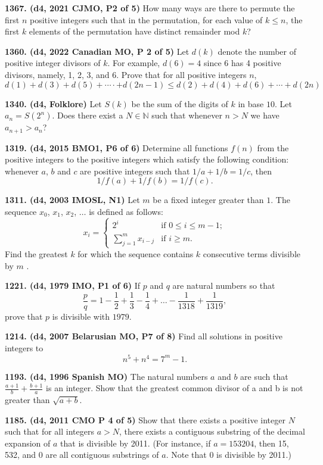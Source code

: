 \documentclass{article}
\begin{document}
\textbf{1367. (\color{red}d4\color{black}, 2021 CJMO, P2 of 5)} How many ways are there to permute the first $n$ positive integers such that in the
permutation, for each value of $k \leq n$, the first $k$ elements of the permutation have
distinct remainder mod $k$?

\textbf{1360. (\color{red}d4\color{black}, 2022 Canadian MO, P 2 of 5)} Let $d(k)$ denote the number of positive integer divisors of $k$. For example, $d(6) = 4$ since
6 has 4 positive divisors, namely, 1, 2, 3, and 6. Prove that for all positive integers $n$, $d(1) + d(3) + d(5) + \cdots· + d(2n - 1) \leq d(2) + d(4) + d(6) + \cdots + d(2n)$

\textbf{1340. (\color{red}d4\color{black}, Folklore)} Let $S(k)$ be the sum of the digits of $k$ in base $10$. Let $a_n = S(2^n)$. Does there exist a $N \in \mathbb{N}$ such that whenever $n > N$ we have $a_{n+1} > a_n$?

\textbf{1319. (\color{red}d4\color{black}, 2015 BMO1, P6 of 6)} Determine all functions \(f(n)\) from the positive integers to the positive integers which satisfy the following condition: whenever \(a\), \(b\) and \(c\) are positive integers such that \(1/a + 1/b = 1/c\), then \[1/f (a) + 1/f (b) = 1/f (c).\]

\textbf{1311. (\color{red}d4\color{black}, 2003 IMOSL, N1)} Let $m$ be a fixed integer greater than $1$. The sequence $x_0$, $x_1$, $x_2$, $\ldots$ is defined as follows:
\[x_i = \begin{cases}2^i&\text{if }0\leq i \leq m - 1;\\\sum_{j=1}^mx_{i-j}&\text{if }i\geq m.\end{cases}\]Find the greatest $k$ for which the sequence contains $k$ consecutive terms divisible by $m$ .

\textbf{1221. (\color{red}d4\color{black}, 1979 IMO, P1 of 6)} If $p$ and $q$ are natural numbers so that\[ \frac{p}{q}=1-\frac{1}{2}+\frac{1}{3}-\frac{1}{4}+ \ldots -\frac{1}{1318}+\frac{1}{1319}, \]prove that $p$ is divisible with $1979$.

\textbf{1214. (\color{red}d4\color{black}, 2007 Belarusian MO, P7 of 8)} Find all solutions in positive integers to \[n^5+n^4=7^m-1.\]

\textbf{1193. (\color{red}d4\color{black}, 1996 Spanish MO)} The natural numbers $a$ and $b$ are such that $ \frac{a+1}{b}+ \frac{b+1}{a}$ is an integer. Show that the greatest common divisor of a and b is not greater than $\sqrt{a+b}$.

\textbf{1185. (\color{red}d4\color{black}, 2011 CMO P 4 of 5)} Show that there exists a positive integer $N$ such that for all integers $a > N$, there exists
a contiguous substring of the decimal expansion of $a$ that is divisible by 2011. (For
instance, if $a = 153204$, then 15, 532, and 0 are all contiguous substrings of $a$. Note that
0 is divisible by 2011.)
\end{document}
